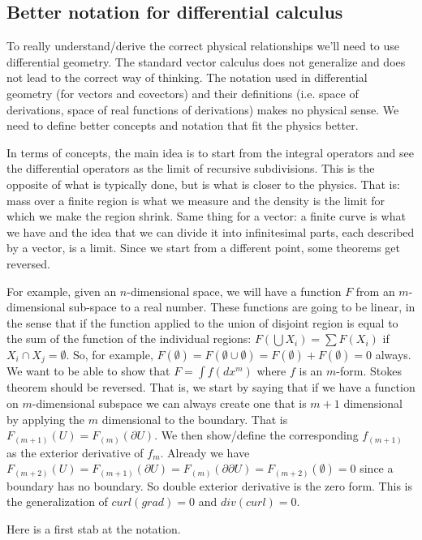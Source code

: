 \documentclass[11pt,letterpaper,fleqn]{memoir} %
\begin{document}
\subsection{Better notation for differential calculus}

To really understand/derive the correct physical relationships we'll need to use differential geometry. The standard vector calculus does not generalize and does not lead to the correct way of thinking. The notation used in differential geometry (for vectors and covectors) and their definitions (i.e. space of derivations, space of real functions of derivations) makes no physical sense. We need to define better concepts and notation that fit the physics better.

In terms of concepts, the main idea is to start from the integral operators and see the differential operators as the limit of recursive subdivisions. This is the opposite of what is typically done, but is what is closer to the physics. That is: mass over a finite region is what we measure and the density is the limit for which we make the region shrink. Same thing for a vector: a finite curve is what we have and the idea that we can divide it into infinitesimal parts, each described by a vector, is a limit. Since we start from a different point, some theorems get reversed.

For example, given an $n$-dimensional space, we will have a function $F$ from an $m$-dimensional sub-space to a real number. These functions are going to be linear, in the sense that if the function applied to the union of disjoint region is equal to the sum of the function of the individual regions: $F(\bigcup X_i) = \sum F(X_i)$ if $X_i \cap X_j = \emptyset$. So, for example, $F(\emptyset) = F(\emptyset \cup \emptyset) = F(\emptyset) + F(\emptyset) = 0$ always. We want to be able to show that $F=\int f(dx^m)$ where $f$ is an $m$-form. Stokes theorem should be reversed. That is, we start by saying that if we have a function on $m$-dimensional subspace we can always create one that is $m+1$ dimensional by applying the $m$ dimensional to the boundary. That is $F_{(m+1)}(U) = F_{(m)}(\partial U)$. We then show/define the corresponding $f_{(m+1)} $ as the exterior derivative of $f_{m}$. Already we have $F_{(m+2)}(U) = F_{(m+1)}(\partial U) = F_{(m)}(\partial \partial U) = F_{(m+2)}(\emptyset) = 0$ since a boundary has no boundary. So double exterior derivative is the zero form. This is the generalization of $curl(grad)=0$ and $div(curl)=0$. 

Here is a first stab at the notation.
\end{document}
